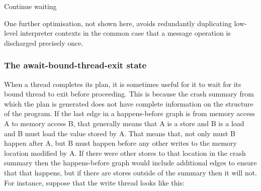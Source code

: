 \begin{algorithmic}[1]
  \EndIf

      \Else
        \State Continue waiting
      \EndIf
    \EndFor
  \EndWhile

    \EndIf
    \Else
      \State {} 
    \EndIf
  \EndFor

\end{algorithmic}

One further optimisation, not shown here, avoids redundantly duplicating low-level interpreter contexts in the common case that a message operation is discharged precisely once.



\subsubsection{The await-bound-thread-exit state}

When a thread completes its plan, it is sometimes useful for it to wait for its bound thread to exit before proceeding.
This is because the crash summary from which the plan is generated does not have complete information on the structure of the program.
If the last edge in a happens-before graph is from memory access A to memory access B, that generally means that A is a store and B is a load and B must load the value stored by A.
That means that, not only must B happen after A, but B must happen before any other writes to the memory location modified by A.
If there were other stores to that location in the crash summary then the happens-before graph would include additional edges to ensure that that happens, but if there are stores outside of the summary then it will not.
For instance, suppose that the write thread looks like this:

